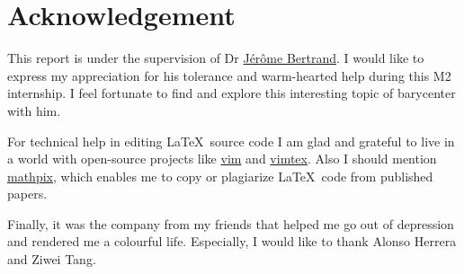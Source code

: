 \section*{Acknowledgement}

This report is under the supervision of Dr \href{https://www.math.univ-toulouse.fr/~bertrand/}{Jérôme Bertrand}. I would like to express my appreciation for his tolerance and warm-hearted help during this M2 internship. I feel fortunate to find and explore this interesting topic of barycenter with him.

For technical help in editing \LaTeX\, source code I am glad and grateful to live in a world with open-source projects like \href{https://www.vim.org/}{vim} and \href{https://github.com/lervag/vimtex}{vimtex}.
Also I should mention \href{https://mathpix.com/}{mathpix}, which enables me to copy or plagiarize \LaTeX\, code from published papers.

Finally, it was the company from my friends that helped me go out of depression and rendered me a colourful life.
Especially, I would like to thank Alonso Herrera and Ziwei Tang.
